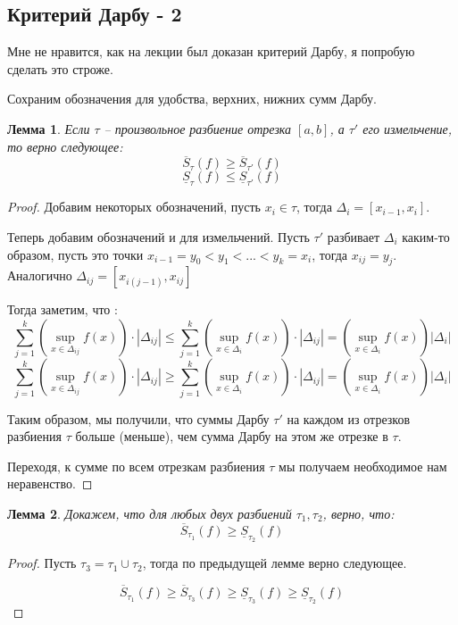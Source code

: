 \documentclass{article}
\theoremstyle{plain}
\newtheorem{lemma}{Лемма}
\theoremstyle{definition}
\theoremstyle{remark}
\renewcommand{\*}{\cdot}
\begin{document}
\subsection{Критерий Дарбу - 2}
Мне не нравится, как на лекции был доказан критерий Дарбу, я попробую сделать это строже.

Сохраним обозначения для удобства, верхних, нижних сумм Дарбу.

\begin{lemma}
    Если $\tau$ -- произвольное разбиение отрезка $[a,b]$, а $\tau'$ его измельчение, то верно следующее:
    \[
        \overline{S}_{\tau}(f) \geq \overline{S}_{\tau'}(f)
    \]
    \[
        \underline{S}_{\tau}(f) \leq \underline{S}_{\tau'}(f)
    \]
\end{lemma}

\begin{proof}
    Добавим некоторых обозначений, пусть $x_i \in \tau$, тогда $\Delta_i = [x_{i-1}, x_i]$.

    Теперь добавим обозначений и для измельчений. Пусть $\tau'$ разбивает $\Delta_i$ каким-то образом,
    пусть это точки $x_{i-1} = y_0 < y_1 < ... < y_k = x_{i}$, тогда $x_{ij} = y_j$. Аналогично $\Delta_{ij} = [x_{i (j-1)}, x_{ij}]$

    Тогда заметим, что :
    \[
        \sum_{j = 1}^k \left(\sup_{x \in \Delta_{ij}}f(x)\right)  \* |\Delta_{ij}| \leq 
        \sum_{j = 1}^k \left(\sup_{x \in \Delta_{i}} f(x)\right) \* |\Delta_{ij}|
        = \left(\sup_{x \in \Delta_{i}} f(x)\right) |\Delta_i|
    \]
    \[
        \sum_{j = 1}^k \left(\sup_{x \in \Delta_{ij}}f(x)\right)  \* |\Delta_{ij}| \geq 
        \sum_{j = 1}^k \left(\sup_{x \in \Delta_{i}} f(x)\right) \* |\Delta_{ij}|
        = \left(\sup_{x \in \Delta_{i}} f(x)\right) |\Delta_i|
    \]
    
    Таким образом, мы получили, что суммы Дарбу $\tau'$ на каждом из отрезков 
    разбиения $\tau$ больше (меньше), чем сумма Дарбу на этом же отрезке в $\tau$.

    Переходя, к сумме по всем отрезкам разбиения $\tau$ мы получаем необходимое нам неравенство.
\end{proof}

\begin{lemma}
    Докажем, что для любых двух разбиений $\tau_1, \tau_2$, верно, что:
   \[
       \overline{S}_{\tau_1}(f) \geq \underline{S}_{\tau_2} (f)
    \]
\end{lemma}

\begin{proof}
    Пусть $\tau_3 = \tau_1 \cup \tau_2$, тогда по предыдущей лемме верно следующее.

    \[
       \overline{S}_{\tau_1}(f) \geq \overline{S}_{\tau_3}(f) \geq \underline{S}_{\tau_3}(f) \geq \underline{S}_{\tau_2} (f)
    \]

\end{proof}
\end{document}

